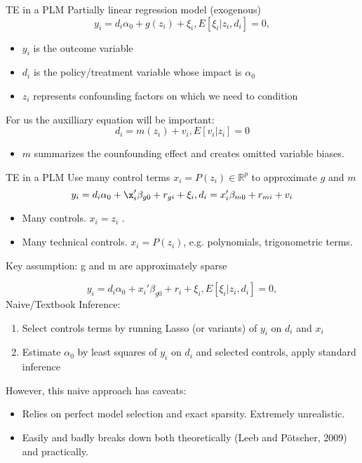 \documentclass{beamer}
\begin{document}
\begin{frame}{TE in a PLM}
Partially linear regression model (exogenous)
\[ y_i = d_i \alpha_0 + g(z_i) + \xi_i,  E[\xi_i|z_i, d_i ] = 0, \]
\begin{itemize}
\item $y_i$ is the outcome variable
\item $d_i$ is the policy/treatment variable whose impact is $\alpha_0$
\item $z_i$ represents confounding factors on which we need to condition
\end{itemize}
For us the auxilliary equation will be important:
\[ d_i = m(z_i) + v_i, E[v_i | z_i ] = 0 \]
\begin{itemize}
	\item $m$ summarizes the counfounding effect and creates omitted
variable biases.
\end{itemize}
\end{frame}

\begin{frame}{TE in a PLM}
Use many control terms $x_i = P(z_i) \in \mathbb{R}^p$ to approximate $g$ and $m$
\[ y_i = d_i\alpha_0 + \x_i' \beta_{g0} + r_{gi} + \xi_i, d_i=x_i' \beta_{m0} + r_{mi} + v_i\]
\begin{itemize}
\item Many controls. $x_i = z_i$ .
\item Many technical controls. $x_i = P(z_i)$, e.g. polynomials,
trigonometric terms.
\end{itemize}
Key assumption: g and m are approximately sparse
\end{frame}

\begin{frame}
\[	y_i = d_i \alpha_0 + x_i' \beta_{g0} + r_i + \xi_i,  E[\xi_i| z_i, d_i ] = 0, \]
Naive/Textbook Inference:
\begin{enumerate}
\item Select controls terms by running Lasso (or variants) of $y_i$ on $d_i$
and $x_i$
\item Estimate $\alpha_0$ by least squares of $y_i$ on $d_i$ and selected controls,
apply standard inference
\end{enumerate}
However, this naive approach has caveats:
\begin{itemize}
\item Relies on perfect model selection and exact sparsity. Extremely
unrealistic.
\item Easily and badly breaks down both theoretically (Leeb and
P\"otscher, 2009) and practically.
\end{itemize}
\end{frame}
\end{document}
